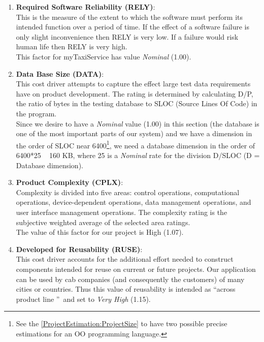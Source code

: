\documentclass[\mainpath/main]{subfiles}
\begin{document}
\begin{enumerate}
	\item \textbf{Required Software Reliability (RELY)}:\\
	This is the measure of the extent to which the software must perform its intended
	function over a period of time. If the effect of a software failure is only slight inconvenience
	then RELY is very low. If a failure would risk human life then RELY is very high.\\
	This factor for myTaxiService has value \textit{Nominal} (1.00).
	
	\item \textbf{Data Base Size (DATA)}:\\
	This cost driver attempts to capture the effect large test data requirements have on
	product development. The rating is determined by calculating D/P, the ratio of bytes in the
	testing database to SLOC (Source Lines Of Code) in the program.\\
	Since we desire to have a \textit{Nominal} value (1.00) in this section (the database is one of the most important parts of our system) and we have a dimension in the order of SLOC near 6400\footnote{See the \autoref{ProjectEstimation:ProjectSize} to have two possible precise estimations for an OO programming language.}, we need a database dimension in the order of 6400*25 ~ 160 KB, where 25 is a \textit{Nominal} rate for the division D/SLOC (D = Database dimension).
	
	\item \textbf{Product Complexity (CPLX)}:\\
	Complexity is divided into five areas: control operations, computational operations,
	device-dependent operations, data management operations, and user interface management
	operations. The complexity rating is the subjective weighted
	average of the selected area ratings.\\
	The value of this factor for our project is High (1.07).
	
	\item \textbf{Developed for Reusability (RUSE)}:\\
	This cost driver accounts for the additional effort needed to construct components intended for reuse on current or future projects. Our application can be used by cab companies (and consequently the customers) of many cities or countries. Thus this value of reusability is intended as \textquotedblleft across product line \textquotedblright\ and set to \textit{Very High} (1.15).
	

\end{enumerate}
\end{document}
